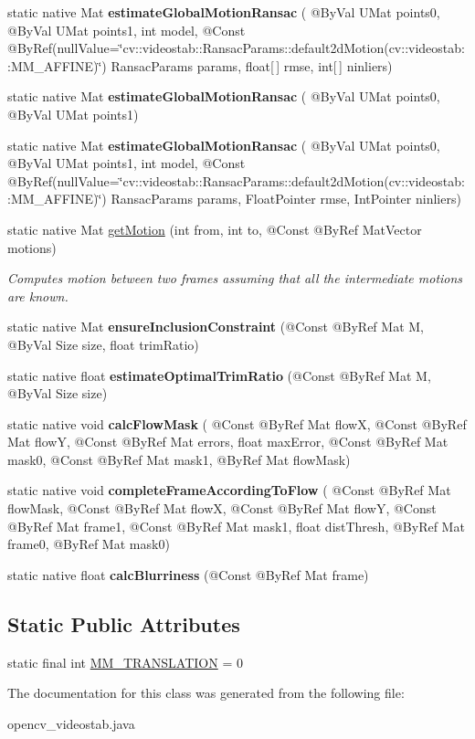 \begin{DoxyCompactItemize}
\item 
static native Mat {\bfseries estimate\+Global\+Motion\+Ransac} ( @By\+Val U\+Mat points0, @By\+Val U\+Mat points1, int model, @Const @By\+Ref(null\+Value=\char`\"{}cv\+::videostab\+::\+Ransac\+Params\+::default2d\+Motion(cv\+::videostab\+::\+M\+M\+\_\+\+A\+F\+F\+I\+NE)\char`\"{}) Ransac\+Params params, float\mbox{[}$\,$\mbox{]} rmse, int\mbox{[}$\,$\mbox{]} ninliers)
\item 
static native Mat {\bfseries estimate\+Global\+Motion\+Ransac} ( @By\+Val U\+Mat points0, @By\+Val U\+Mat points1)
\item 
static native Mat {\bfseries estimate\+Global\+Motion\+Ransac} ( @By\+Val U\+Mat points0, @By\+Val U\+Mat points1, int model, @Const @By\+Ref(null\+Value=\char`\"{}cv\+::videostab\+::\+Ransac\+Params\+::default2d\+Motion(cv\+::videostab\+::\+M\+M\+\_\+\+A\+F\+F\+I\+NE)\char`\"{}) Ransac\+Params params, Float\+Pointer rmse, Int\+Pointer ninliers)
\item 
static native Mat \hyperlink{group__videostab__motion_ga1e73edce6a2ac4dee3f6a1ae7ec06d26}{get\+Motion} (int from, int to, @Const @By\+Ref Mat\+Vector motions)
\begin{DoxyCompactList}\small\item\em Computes motion between two frames assuming that all the intermediate motions are known. \end{DoxyCompactList}\item 
static native Mat {\bfseries ensure\+Inclusion\+Constraint} (@Const @By\+Ref Mat M, @By\+Val Size size, float trim\+Ratio)
\item 
static native float {\bfseries estimate\+Optimal\+Trim\+Ratio} (@Const @By\+Ref Mat M, @By\+Val Size size)
\item 
static native void {\bfseries calc\+Flow\+Mask} ( @Const @By\+Ref Mat flowX, @Const @By\+Ref Mat flowY, @Const @By\+Ref Mat errors, float max\+Error, @Const @By\+Ref Mat mask0, @Const @By\+Ref Mat mask1, @By\+Ref Mat flow\+Mask)
\item 
static native void {\bfseries complete\+Frame\+According\+To\+Flow} ( @Const @By\+Ref Mat flow\+Mask, @Const @By\+Ref Mat flowX, @Const @By\+Ref Mat flowY, @Const @By\+Ref Mat frame1, @Const @By\+Ref Mat mask1, float dist\+Thresh, @By\+Ref Mat frame0, @By\+Ref Mat mask0)
\item 
static native float {\bfseries calc\+Blurriness} (@Const @By\+Ref Mat frame)
\end{DoxyCompactItemize}
\subsection*{Static Public Attributes}
\begin{DoxyCompactItemize}
\item 
static final int \hyperlink{group__videostab__motion_ga1dfde997ecf6b23eb737a2b7461597cf}{M\+M\+\_\+\+T\+R\+A\+N\+S\+L\+A\+T\+I\+ON} = 0
\end{DoxyCompactItemize}


The documentation for this class was generated from the following file\+:\begin{DoxyCompactItemize}
\item 
opencv\+\_\+videostab.\+java\end{DoxyCompactItemize}
